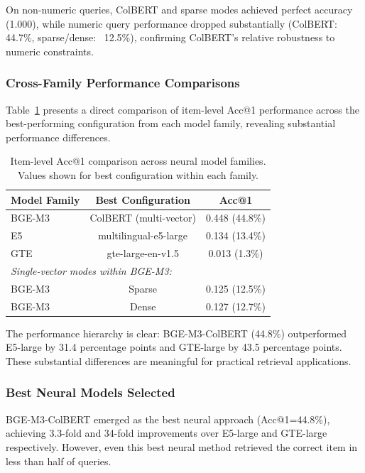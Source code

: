 \documentclass[preprint,12pt]{elsarticle}
\begin{document}
On non-numeric queries, ColBERT and sparse modes achieved perfect accuracy (1.000), while numeric query performance dropped substantially (ColBERT: 44.7\%, sparse/dense: ~12.5\%), confirming ColBERT's relative robustness to numeric constraints.

\subsubsection{Cross-Family Performance Comparisons}

Table~\ref{tab:neural_comparison} presents a direct comparison of item-level Acc@1 performance across the best-performing configuration from each model family, revealing substantial performance differences.

\begin{table}[htbp]
\centering
\caption{Item-level Acc@1 comparison across neural model families. Values shown for best configuration within each family.}
\label{tab:neural_comparison}
\begin{tabular}{lcc}
\hline
\textbf{Model Family} & \textbf{Best Configuration} & \textbf{Acc@1} \\
\hline
BGE-M3 & ColBERT (multi-vector) & 0.448 (44.8\%) \\
E5 & multilingual-e5-large & 0.134 (13.4\%) \\
GTE & gte-large-en-v1.5 & 0.013 (1.3\%) \\
\hline
\multicolumn{3}{l}{\textit{Single-vector modes within BGE-M3:}} \\
BGE-M3 & Sparse & 0.125 (12.5\%) \\
BGE-M3 & Dense & 0.127 (12.7\%) \\
\hline
\end{tabular}
\end{table}

The performance hierarchy is clear: BGE-M3-ColBERT (44.8\%) outperformed E5-large by 31.4 percentage points and GTE-large by 43.5 percentage points. These substantial differences are meaningful for practical retrieval applications.

\subsubsection{Best Neural Models Selected}

BGE-M3-ColBERT emerged as the best neural approach (Acc@1=44.8\%), achieving 3.3-fold and 34-fold improvements over E5-large and GTE-large respectively. However, even this best neural method retrieved the correct item in less than half of queries.
\end{document}

